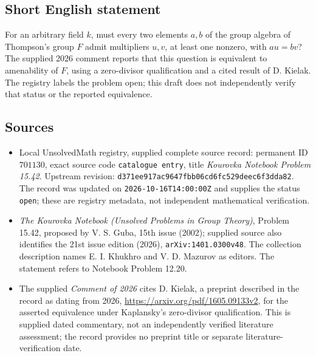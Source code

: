 \documentclass[11pt]{article}
\begin{document}
\subsection{Short English statement}
For an arbitrary field \(k\), must every two elements \(a,b\) of the group algebra of Thompson's group \(F\) admit multipliers \(u,v\), at least one nonzero, with \(au=bv\)? The supplied 2026 comment reports that this question is equivalent to amenability of \(F\), using a zero-divisor qualification and a cited result of D. Kielak. The registry labels the problem open; this draft does not independently verify that status or the reported equivalence.
\subsection{Sources}
\begin{itemize}
\item Local UnsolvedMath registry, supplied complete source record: permanent ID \(701130\), exact source code \texttt{catalogue entry}, title \emph{Kourovka Notebook Problem 15.42}. Upstream revision: \texttt{d371ee917ac9647fbb06cd6fc529deec6f3dda82}. The record was updated on \texttt{2026-10-16T14:00:00Z} and supplies the status \texttt{open}; these are registry metadata, not independent mathematical verification.
\item \emph{The Kourovka Notebook (Unsolved Problems in Group Theory)}, Problem 15.42, proposed by V. S. Guba, 15th issue (2002); supplied source also identifies the 21st issue edition (2026), \texttt{arXiv:1401.0300v48}. The collection description names E. I. Khukhro and V. D. Mazurov as editors. The statement refers to Notebook Problem 12.20.
\item The supplied \emph{Comment of 2026} cites D. Kielak, a preprint described in the record as dating from 2026, \url{https://arxiv.org/pdf/1605.09133v2}, for the asserted equivalence under Kaplansky's zero-divisor qualification. This is supplied dated commentary, not an independently verified literature assessment; the record provides no preprint title or separate literature-verification date.
\end{itemize}
\end{document}
